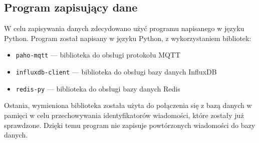 \subsection{Program zapisujący dane}
W celu zapisywania danych zdecydowano użyć programu napisanego w języku Python. Program został napisany w języku Python, z wykorzystaniem bibliotek:
\begin{itemize}
    \item \texttt{paho-mqtt} — biblioteka do obsługi protokołu MQTT~\cite{py:paho-mqtt}
    \item \texttt{influxdb-client} — biblioteka do obsługi bazy danych InfluxDB~\cite{py:influxdb}
    \item \texttt{redis-py} — biblioteka do obsługi bazy danych Redis~\cite{py:redis}
\end{itemize}
Ostania, wymieniona biblioteka została użyta do połączenia się z bazą danych w pamięci w celu przechowywania identyfikatorów wiadomości, które zostały już sprawdzone. Dzięki temu program nie zapisuje powtórzonych wiadomości do bazy danych.
